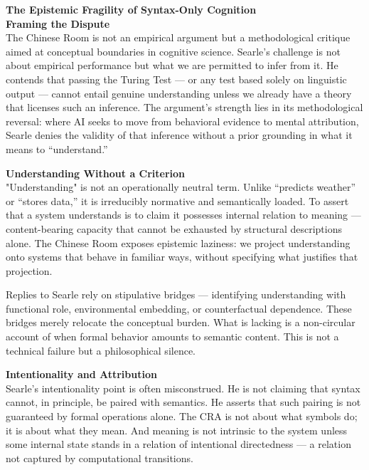 \begin{technical}
{\Large\textbf{The Epistemic Fragility of Syntax-Only Cognition}}\\[0.7em]

\noindent\textbf{Framing the Dispute}\\[0.5em]
The Chinese Room is not an empirical argument but a methodological critique aimed at conceptual boundaries in cognitive science. Searle's challenge is not about empirical performance but what we are permitted to infer from it. He contends that passing the Turing Test — or any test based solely on linguistic output — cannot entail genuine understanding unless we already have a theory that licenses such an inference. The argument's strength lies in its methodological reversal: where AI seeks to move from behavioral evidence to mental attribution, Searle denies the validity of that inference without a prior grounding in what it means to “understand.”

\noindent\textbf{Understanding Without a Criterion}\\[0.5em]
"Understanding" is not an operationally neutral term. Unlike “predicts weather” or “stores data,” it is irreducibly normative and semantically loaded. To assert that a system understands is to claim it possesses internal relation to meaning — content-bearing capacity that cannot be exhausted by structural descriptions alone. The Chinese Room exposes epistemic laziness: we project understanding onto systems that behave in familiar ways, without specifying what justifies that projection.

Replies to Searle rely on stipulative bridges — identifying understanding with functional role, environmental embedding, or counterfactual dependence. These bridges merely relocate the conceptual burden. What is lacking is a non-circular account of when formal behavior amounts to semantic content. This is not a technical failure but a philosophical silence.

\noindent\textbf{Intentionality and Attribution}\\[0.5em]
Searle's intentionality point is often misconstrued. He is not claiming that syntax cannot, in principle, be paired with semantics. He asserts that such pairing is not guaranteed by formal operations alone. The CRA is not about what symbols do; it is about what they mean. And meaning is not intrinsic to the system unless some internal state stands in a relation of intentional directedness — a relation not captured by computational transitions.


\end{technical}
